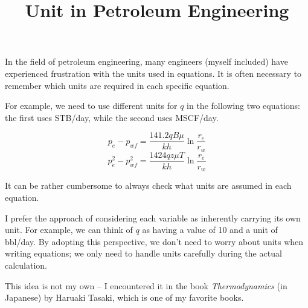 \documentclass[letterpaper, 12pt]{article}
\title{Unit in Petroleum Engineering}
\date{}
\theoremstyle{custom}
\begin{document}
\maketitle
In the field of petroleum engineering, many engineers (myself included) have experienced frustration with the units used in equations.
It is often necessary to remember which units are required in each specific equation.

For example, we need to use different units for $q$ in the following two equations: the first uses STB/day, while the second uses MSCF/day.

\begin{equation*}
  p_e - p_{wf} = \frac{141.2 qB\mu}{kh} \ln \frac{r_e}{r_w}
\end{equation*}
\begin{equation*}
  p_e^2 - p_{wf}^2 = \frac{1424 q z \mu T}{kh} \ln \frac{r_e}{r_w}
\end{equation*}

It can be rather cumbersome to always check what units are assumed in each equation.

I prefer the approach of considering each variable as inherently carrying its own unit.
For example, we can think of $q$ as having a value of 10 and a unit of bbl/day.
By adopting this perspective, we don't need to worry about units when writing equations;
we only need to handle units carefully during the actual calculation.

This idea is not my own -- I encountered it in the book \textit{Thermodynamics} (in Japanese) by Haruaki Tasaki, which is one of my favorite books.
\end{document}
